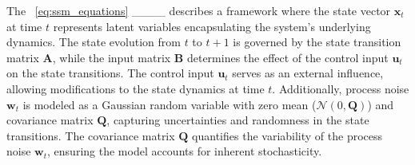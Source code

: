 The ~\cref{eq:ssm_equations} ____ describes a framework where the state vector \( \mathbf{x}_t \) at time \( t \) represents latent variables encapsulating the system's underlying dynamics. The state evolution from \( t \) to \( t+1 \) is governed by the state transition matrix \( \mathbf{A} \), while the input matrix \( \mathbf{B} \) determines the effect of the control input \( \mathbf{u}_t \) on the state transitions. The control input \( \mathbf{u}_t \) serves as an external influence, allowing modifications to the state dynamics at time \( t \). Additionally, process noise \( \mathbf{w}_t \) is modeled as a Gaussian random variable with zero mean (\( \mathcal{N}(0, \mathbf{Q}) \)) and covariance matrix \( \mathbf{Q} \), capturing uncertainties and randomness in the state transitions. The covariance matrix \( \mathbf{Q} \) quantifies the variability of the process noise \( \mathbf{w}_t \), ensuring the model accounts for inherent stochasticity.\\
